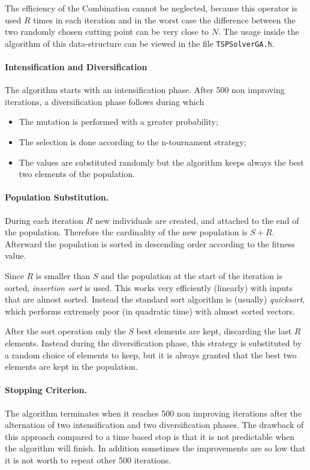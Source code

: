 The efficiency of the Combination cannot be neglected, because this operator is used $R$ times in each
iteration and in the worst case the difference between the two randomly chosen cutting point can be very close to $N$.
The usage inside the algorithm of this data-structure can be viewed in the file \verb|TSPSolverGA.h|. 

\paragraph{Intensification and Diversification} The algorithm starts with an intensification phase. 
After 500 non improving iterations, a diversification phase follows during which
\begin{itemize}
	\item The mutation is performed with a greater probability;
	\item The selection is done according to the n-tournament strategy;
	\item The values are substituted  randomly but the algorithm keeps always the best two elements of the population.
\end{itemize}  

\paragraph{Population Substitution.} During each iteration $R$ new individuals are created,
and attached to the end of the population. Therefore
the cardinality of the new population is  $S+R$.
Afterward the population is sorted in descending order according to the fitness value. 

Since $R$ is smaller than $S$ and the population
at the start of the iteration is sorted, \emph{insertion sort}
is used. This works very efficiently (linearly) with inputs that are almost sorted.
Instead the standard sort algorithm is (usually) \emph{quicksort}, which performs extremely poor (in quadratic time) with almost sorted vectors.

After the sort operation only the $S$ best elements are kept, discarding the last $R$ elements.
Instead during the diversification phase, this strategy is substituted by a random choice of elements to keep, but it is always granted
that the best two elements are kept in the population.

\paragraph{Stopping Criterion.} The algorithm terminates when it reaches 500 non improving iterations after
the alternation of two intensification and two diversification phases.
The drawback of this approach compared to a time based stop is that it is not predictable when
the algorithm will finish. In addition sometimes the improvements are so low that it is not worth to repeat other 500 iterations.

